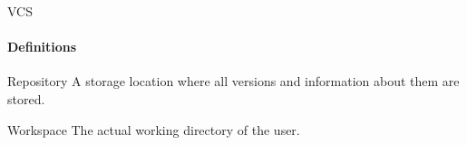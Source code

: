 \documentclass{beamer}
\newcommand{\cmark}{\ding{51}}%
\newcommand{\xmark}{\ding{55}}%
\begin{document}



%
%

\begin{frame}{VCS}
    \framesubtitle{Definitions}
    
    \begin{block}{Repository}
    	A storage location where all versions and information about them are stored.
    \end{block}

	\begin{block}{Workspace}
		The actual working directory of the user.
	\end{block}
\end{frame}
\end{document}
